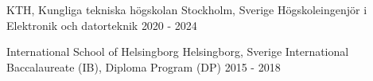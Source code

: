 \documentclass[../main.tex]{subfiles}
\begin{document}
\company
    {KTH, Kungliga tekniska högskolan} 
    {Stockholm, Sverige}
\titles
    {Högskoleingenjör i Elektronik och datorteknik} 
    {2020 - 2024}
    {}

\company
    {International School of Helsingborg} 
    {Helsingborg, Sverige}
\titles
    {International Baccalaureate (IB), Diploma Program (DP)} 
    {2015 - 2018} 
    
\end{document}
